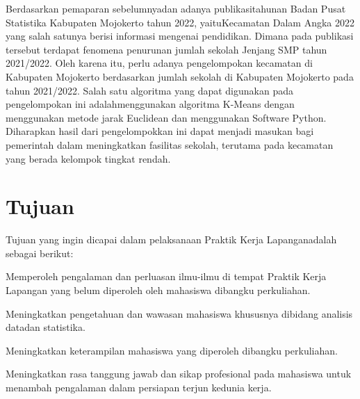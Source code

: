 Berdasarkan pemaparan sebelumnyadan adanya publikasitahunan Badan Pusat Statistika Kabupaten Mojokerto tahun 2022, yaituKecamatan Dalam Angka 2022 yang salah satunya berisi informasi mengenai pendidikan. Dimana pada publikasi tersebut terdapat fenomena penurunan jumlah sekolah Jenjang SMP tahun 2021/2022. Oleh karena itu, perlu adanya pengelompokan kecamatan di Kabupaten Mojokerto berdasarkan jumlah sekolah di Kabupaten Mojokerto pada tahun 2021/2022. Salah satu algoritma yang dapat digunakan pada pengelompokan ini adalahmenggunakan algoritma K-Means dengan menggunakan metode jarak Euclidean dan menggunakan Software Python. Diharapkan hasil dari pengelompokkan ini dapat menjadi masukan bagi pemerintah dalam meningkatkan fasilitas sekolah, terutama pada kecamatan yang berada kelompok tingkat rendah.

\section{Tujuan}
Tujuan yang ingin dicapai dalam pelaksanaan Praktik Kerja Lapanganadalah sebagai berikut: 
\begin{daftar}
	\item Memperoleh pengalaman dan perluasan ilmu-ilmu di tempat Praktik Kerja Lapangan yang belum diperoleh oleh mahasiswa dibangku perkuliahan.
	\item Meningkatkan pengetahuan dan wawasan mahasiswa khususnya dibidang analisis datadan statistika. 
	\item Meningkatkan  keterampilan  mahasiswa  yang  diperoleh  dibangku perkuliahan.
	\item Meningkatkan rasa tanggung jawab dan sikap profesional pada mahasiswa untuk menambah pengalaman dalam persiapan terjun kedunia kerja.
\end{daftar}

